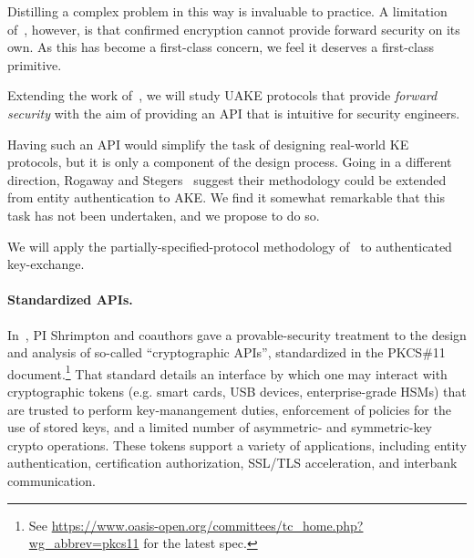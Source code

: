 Distilling a complex problem in this way is invaluable to practice. A
limitation of~\cite{dodis2017unilateral}, however, is that confirmed encryption
cannot provide forward security on its own. As this has become a first-class
concern, we feel it deserves a first-class primitive.
%

\begin{task}
  Extending the work of~\cite{dodis2017unilateral}, we will study UAKE protocols
  that provide \emph{forward security} with the aim of providing an API that is
  intuitive for security engineers.
\end{task}

Having such an API would simplify the task of designing real-world KE
protocols, but it is only a component of the design process.
Going in a different direction, Rogaway and Stegers~\cite{RS09} suggest their
methodology could be extended from entity authentication to AKE. We find it
somewhat remarkable that this task has not been undertaken, and we propose to do
so.
\begin{task}
  We will apply the partially-specified-protocol methodology of~\cite{RS09} to
  authenticated key-exchange.
\end{task}


\paragraph{Standardized APIs. }
%
In~\cite{SSW}, PI Shrimpton and coauthors gave a provable-security treatment to
the design and analysis of so-called ``cryptographic APIs'', standardized in the
PKCS\#11 document.\footnote{See
\url{https://www.oasis-open.org/committees/tc_home.php?wg_abbrev=pkcs11} for the
latest spec.} That standard details an interface by which one may interact with
cryptographic tokens (e.g. smart cards, USB devices, enterprise-grade HSMs) that
are trusted to perform key-manangement duties, enforcement of policies for the
use of stored keys, and a limited number of asymmetric- and symmetric-key crypto
operations.  These tokens support a variety of applications, including entity
authentication, certification authorization, SSL/TLS acceleration, and interbank
communication.
%

